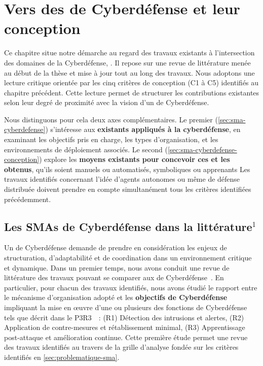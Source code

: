\clearpage
\thispagestyle{empty}
\null
\newpage

\chapter{Vers des  de Cyberdéfense et leur conception}

% 

\noindent
Ce chapitre situe notre démarche au regard des travaux existants à l'intersection des domaines de la Cyberdéfense, . Il repose sur une revue de littérature menée au début de la thèse et mise à jour tout au long des travaux.
%
Nous adoptons une lecture critique orientée par les cinq critères de conception (C1 à C5) identifiés au chapitre précédent. Cette lecture permet de structurer les contributions existantes selon leur degré de proximité avec la vision d'un  de Cyberdéfense.

Nous distinguons pour cela deux axes complémentaires. Le premier (\autoref{sec:sma-cyberdefense}) s'intéresse aux \textbf{ existants appliqués à la cyberdéfense}, en examinant les objectifs pris en charge, les types d'organisation, et les environnements de déploiement associés. Le second (\autoref{sec:sma-cyberdefense-conception}) explore les \textbf{moyens existants pour concevoir ces  et les  obtenus}, qu'ils soient manuels ou automatisés, symboliques ou apprenants
%
Les travaux identifiés concernant l'idée d'agents autonomes ou même de défense distribuée doivent prendre en compte simultanément tous les critères identifiées précédemment.


\section{Les SMAs de Cyberdéfense dans la littérature$^{1}$}\label{sec:sma-cyberdefense}


Un  de Cyberdéfense demande de prendre en considération les enjeux de structuration, d'adaptabilité et de coordination dans un environnement critique et dynamique.
Dans un premier temps, nous avons conduit une revue de littérature des travaux pouvant se comparer aux  de Cyberdéfense~\cite{soule2023ressithese}.
En particulier, pour chacun des travaux identifiés, nous avons étudié le rapport entre le mécanisme d'organisation adopté et les \textbf{objectifs de Cyberdéfense} impliquant la mise en œuvre d'une ou plusieurs des fonctions de Cyberdéfense tels que décrit dans le P3R3~\cite{Theron2013P3R3}~:
(R1) Détection des intrusions et alertes,
(R2) Application de contre-mesures et rétablissement minimal,
(R3) Apprentissage post-attaque et amélioration continue.
Cette première étude permet une revue des travaux identifiés au travers de la grille d'analyse fondée sur les critères identifiés en \autoref{sec:problematique-sma}.

